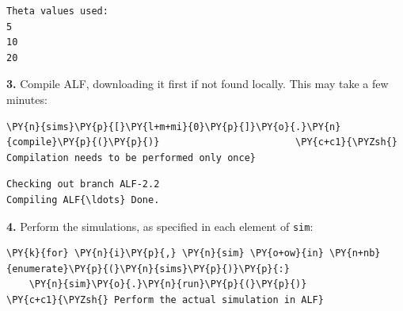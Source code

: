     \begin{Verbatim}[commandchars=\\\{\}]
Theta values used:
5
10
20
    \end{Verbatim}

    \textbf{3.} Compile ALF, downloading it first if not found locally. This
may take a few minutes:

    \begin{tcolorbox}[breakable, size=fbox, boxrule=1pt, pad at break*=1mm,colback=cellbackground, colframe=cellborder]
\begin{Verbatim}[commandchars=\\\{\}]
\PY{n}{sims}\PY{p}{[}\PY{l+m+mi}{0}\PY{p}{]}\PY{o}{.}\PY{n}{compile}\PY{p}{(}\PY{p}{)}                        \PY{c+c1}{\PYZsh{} Compilation needs to be performed only once}
\end{Verbatim}
\end{tcolorbox}

    \begin{Verbatim}[commandchars=\\\{\}]
Checking out branch ALF-2.2
Compiling ALF{\ldots} Done.
    \end{Verbatim}

    \textbf{4.} Perform the simulations, as specified in each element of
\texttt{sim}:

    \begin{tcolorbox}[breakable, size=fbox, boxrule=1pt, pad at break*=1mm,colback=cellbackground, colframe=cellborder]
\begin{Verbatim}[commandchars=\\\{\}]
\PY{k}{for} \PY{n}{i}\PY{p}{,} \PY{n}{sim} \PY{o+ow}{in} \PY{n+nb}{enumerate}\PY{p}{(}\PY{n}{sims}\PY{p}{)}\PY{p}{:}
    \PY{n}{sim}\PY{o}{.}\PY{n}{run}\PY{p}{(}\PY{p}{)}                            \PY{c+c1}{\PYZsh{} Perform the actual simulation in ALF}
\end{Verbatim}
\end{tcolorbox}

